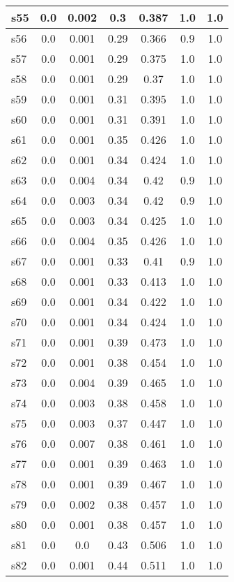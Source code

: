 \documentclass{article}
\begin{document}
\begin{tabular}{|l|c|c|c|c|c|c|}
\hline
s55 &0.0 & 0.002 & 0.3 & 0.387 & 1.0 & 1.0\\
\hline
s56 &0.0 & 0.001 & 0.29 & 0.366 & 0.9 & 1.0\\
\hline
s57 &0.0 & 0.001 & 0.29 & 0.375 & 1.0 & 1.0\\
\hline
s58 &0.0 & 0.001 & 0.29 & 0.37 & 1.0 & 1.0\\
\hline
s59 &0.0 & 0.001 & 0.31 & 0.395 & 1.0 & 1.0\\
\hline
s60 &0.0 & 0.001 & 0.31 & 0.391 & 1.0 & 1.0\\
\hline
s61 &0.0 & 0.001 & 0.35 & 0.426 & 1.0 & 1.0\\
\hline
s62 &0.0 & 0.001 & 0.34 & 0.424 & 1.0 & 1.0\\
\hline
s63 &0.0 & 0.004 & 0.34 & 0.42 & 0.9 & 1.0\\
\hline
s64 &0.0 & 0.003 & 0.34 & 0.42 & 0.9 & 1.0\\
\hline
s65 &0.0 & 0.003 & 0.34 & 0.425 & 1.0 & 1.0\\
\hline
s66 &0.0 & 0.004 & 0.35 & 0.426 & 1.0 & 1.0\\
\hline
s67 &0.0 & 0.001 & 0.33 & 0.41 & 0.9 & 1.0\\
\hline
s68 &0.0 & 0.001 & 0.33 & 0.413 & 1.0 & 1.0\\
\hline
s69 &0.0 & 0.001 & 0.34 & 0.422 & 1.0 & 1.0\\
\hline
s70 &0.0 & 0.001 & 0.34 & 0.424 & 1.0 & 1.0\\
\hline
s71 &0.0 & 0.001 & 0.39 & 0.473 & 1.0 & 1.0\\
\hline
s72 &0.0 & 0.001 & 0.38 & 0.454 & 1.0 & 1.0\\
\hline
s73 &0.0 & 0.004 & 0.39 & 0.465 & 1.0 & 1.0\\
\hline
s74 &0.0 & 0.003 & 0.38 & 0.458 & 1.0 & 1.0\\
\hline
s75 &0.0 & 0.003 & 0.37 & 0.447 & 1.0 & 1.0\\
\hline
s76 &0.0 & 0.007 & 0.38 & 0.461 & 1.0 & 1.0\\
\hline
s77 &0.0 & 0.001 & 0.39 & 0.463 & 1.0 & 1.0\\
\hline
s78 &0.0 & 0.001 & 0.39 & 0.467 & 1.0 & 1.0\\
\hline
s79 &0.0 & 0.002 & 0.38 & 0.457 & 1.0 & 1.0\\
\hline
s80 &0.0 & 0.001 & 0.38 & 0.457 & 1.0 & 1.0\\
\hline
s81 &0.0 & 0.0 & 0.43 & 0.506 & 1.0 & 1.0\\
\hline
s82 &0.0 & 0.001 & 0.44 & 0.511 & 1.0 & 1.0\\
\hline

\end{tabular}
\end{document}
